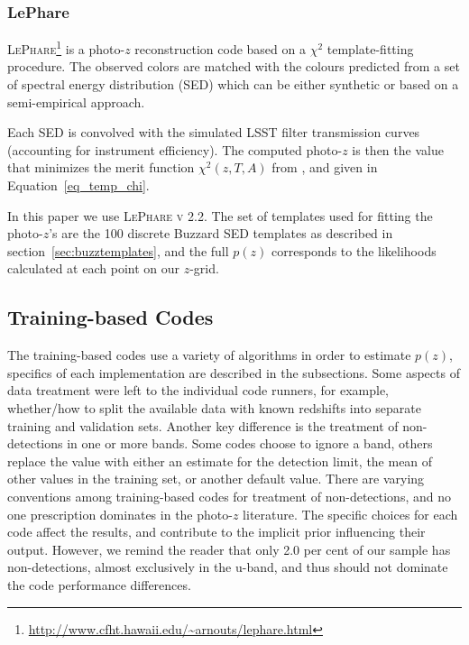 \subsubsection{LePhare}\label{sec:lephare}

\textsc{LePhare}\footnote{\url{http://www.cfht.hawaii.edu/~arnouts/lephare.html}}\citep[Photometric Analysis for Redshift Estimate,][]{Arnouts:99,Ilbert:06} is a photo-$z$ reconstruction code based on a $\chi^2$ template-fitting procedure. The observed colors are matched with the colours predicted from a set of spectral energy distribution (SED) which can be either synthetic or based on a semi-empirical approach. %

Each SED is convolved with the simulated LSST filter transmission curves (accounting for instrument efficiency).  The computed photo-$z$ is then the value that minimizes the merit function $\chi^2 (z,T,A)$ from \citet[]{Arnouts:99}, and given in Equation~\ref{eq_temp_chi}.

In this paper we use \textsc{LePhare v 2.2}.
The set of templates used for fitting the photo-$z$'s are the 100 discrete Buzzard SED templates as described in section~\ref{sec:buzztemplates}, and the full $p(z)$ corresponds to the likelihoods calculated at each point on our $z$-grid.


\subsection{Training-based Codes}
\label{sec:trainingcodes}
The training-based codes use a variety of algorithms in order to estimate $p(z)$, specifics of each implementation are described in the subsections.  Some aspects of data treatment were left to the individual code runners, for example, whether/how to split the available data with known redshifts into separate training and validation sets.  Another key difference is the treatment of non-detections in one or more bands.  Some codes choose to ignore a band, others replace the value with either an estimate for the detection limit, the mean of other values in the training set, or another default value.  There are varying conventions among training-based codes for treatment of non-detections, and no one prescription dominates in the photo-$z$ literature.  The specific choices for each code affect the results, and contribute to the implicit prior influencing their output.  However, we remind the reader that only 2.0 per cent of our sample has non-detections, almost exclusively in the u-band, and thus should not dominate the code performance differences.

